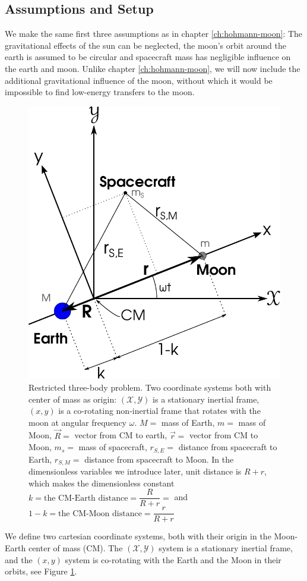 \subsection{Assumptions and Setup}
We make the same first three assumptions as in chapter \ref{ch:hohmann-moon}: The gravitational effects of the sun can be neglected, the moon's orbit around the earth is assumed to be circular and spacecraft mass has negligible influence on the earth and moon. Unlike chapter \ref{ch:hohmann-moon}, we will now include the additional gravitational influence of the moon, without which it would be impossible to find low-energy transfers to the moon.

\begin{figure}[h!]
\centering
\includegraphics[scale=0.75]{fig/r3b.pdf}
\caption{Restricted three-body problem. Two coordinate systems both with center of mass as origin: $(\mathscr{X},\mathscr{Y})$ is a stationary inertial frame, $(x,y)$ is a co-rotating non-inertial frame that rotates with the moon at angular frequency $\omega$. $M =$ mass of Earth, $m =$ mass of Moon, $\vec{R} =$ vector from CM to earth, $\vec{r} =$ vector from CM to Moon, $m_s =$ mass of spacecraft, $r_{S,E} =$ distance from spacecraft to Earth, $r_{S,M} =$ distance from spacecraft to Moon. In the dimensionless variables we introduce later, unit distance is $R+r$, which makes the dimensionless constant $k = \text{the CM-Earth distance} = \dfrac{R}{R+r} = $ and $1-k = \text{the CM-Moon distance} = \dfrac{r}{R+r}$}
\label{fig:r3b}
\end{figure}
We define two cartesian coordinate systems, both with their origin in the Moon-Earth center of mass (CM). The $(\mathscr{X},\mathscr{Y})$ system is a stationary inertial frame, and the $(x,y)$ system is co-rotating with the Earth and the Moon in their orbits, see Figure \ref{fig:r3b}.

